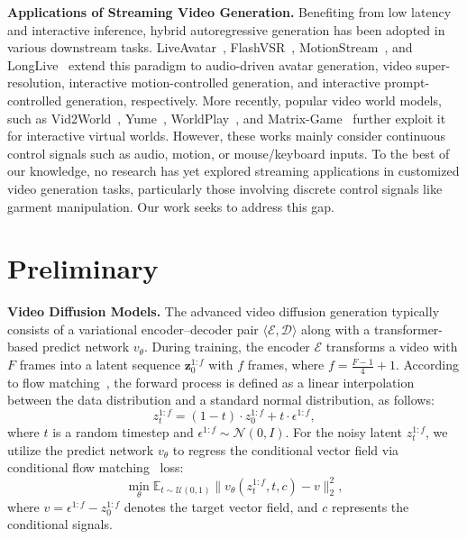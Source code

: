 \noindent
\textbf{Applications of Streaming Video Generation.}
%
Benefiting from low latency and interactive inference, hybrid autoregressive generation has been adopted in various downstream tasks.
% 
LiveAvatar~\cite{huang2025live}, FlashVSR~\cite{zhuang2025flashvsr}, MotionStream~\cite{shin2025motionstream}, and LongLive~\cite{yang2025longlive} extend this paradigm to audio-driven avatar generation, video super-resolution, interactive motion-controlled generation, and interactive prompt-controlled generation, respectively.
% 
More recently, popular video world models, such as Vid2World~\cite{huang2025vid2world}, Yume~\cite{mao2025yume}, WorldPlay~\cite{sun2025worldplay}, and Matrix-Game~\cite{zhang2025matrix} further exploit it for interactive virtual worlds.
% 
However, these works mainly consider continuous control signals such as audio, motion, or mouse/keyboard inputs. To the best of our knowledge, no research has yet explored streaming applications in customized video generation tasks, particularly those involving discrete control signals like garment manipulation. Our work seeks to address this gap.





\section{Preliminary}


\noindent
\textbf{Video Diffusion Models.}
% 
The advanced video diffusion generation typically consists of a variational encoder–decoder pair $\langle \mathcal{E}, \mathcal{D} \rangle$ along with a transformer-based predict network $v_{\theta}$.
% 
During training, the encoder $\mathcal{E}$ transforms a video with $F$ frames into a latent sequence $\mathbf{z}_{0}^{1:f}$ with $f$ frames, where $f = \frac{F - 1}{4} + 1$.
% 
According to flow matching~\cite{lipman2022flow}, the forward process is defined as a linear interpolation between the data distribution and a standard normal distribution, as follows:
% 
\begin{equation}
    z_t^{1:f} = (1 - t) \cdot z_0^{1:f} + t \cdot \epsilon^{1:f},
\label{eq:1}
\end{equation}
% 
where $t$ is a random timestep and $\epsilon^{1:f} \sim \mathcal{N}(0, I)$.
For the noisy latent $z_t^{1:f}$, we utilize the predict network $v_{\theta}$ to regress the conditional vector field via conditional flow matching~\cite{lipman2022flow} loss:
% 
\begin{equation}
    \min_{\theta} \mathbb{E}_{t \sim \mathcal{U}(0,1)} \| v_{\theta}(z_{t}^{1:f}, t, c) - v \|_2^2,
\label{eq:2}
\end{equation}
% 
where $v = \epsilon^{1:f} - z_0^{1:f}$ denotes the target vector field, and $c$ represents the conditional signals.



